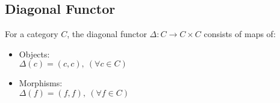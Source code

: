 \subsection{Diagonal Functor}
\begin{definition}
  For a category $C$, the diagonal functor $\Delta: C\to C\times C$ consists of
  maps of: \parencite{awodey:category_theory}
  \begin{itemize}
    \item Objects:\\
      $\Delta(c) = (c, c),\ (\forall c\in C)$
    \item Morphisms:\\
      $\Delta(f) = (f, f),\ (\forall f\in C)$
  \end{itemize}
\end{definition}
